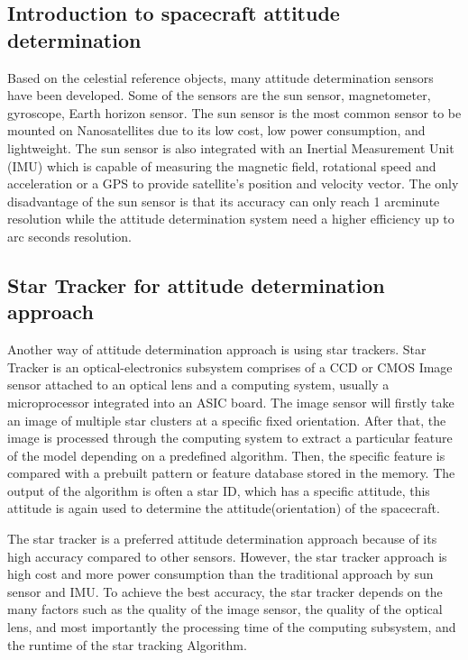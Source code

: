 \subsection{Introduction to spacecraft attitude determination}

Based on the celestial reference objects, many attitude determination sensors have been developed. Some of the sensors are the sun sensor, magnetometer, gyroscope, Earth horizon sensor\cite{MDP}. The sun sensor is the most common sensor to be mounted on Nanosatellites due to its low cost, low power consumption, and lightweight. The sun sensor is also integrated with an Inertial Measurement Unit (IMU) which is capable of measuring the magnetic field, rotational speed and acceleration or a GPS to provide satellite’s position and velocity vector. The only disadvantage of the sun sensor is that its accuracy can only reach 1 arcminute resolution while the attitude determination system need a higher efficiency up to arc seconds resolution\cite{edselc.2-52.0-001938469619810101}.

\subsection{Star Tracker for attitude determination approach}

Another way of attitude determination approach is using star trackers. Star Tracker is an optical-electronics subsystem comprises of a CCD or CMOS Image sensor attached to an optical lens and a computing system, usually a microprocessor integrated into an ASIC board. The image sensor will firstly take an image of multiple star clusters at a specific fixed orientation. After that, the image is processed through the computing system to extract a particular feature of the model depending on a predefined algorithm. Then, the specific feature is compared with a prebuilt pattern or feature database stored in the memory. The output of the algorithm is often a star ID, which has a specific attitude, this attitude is again used to determine the attitude(orientation) of the spacecraft. \\


\noindent The star tracker is a preferred attitude determination approach because of its high accuracy compared to other sensors\cite{ntu.19915319780101}. However, the star tracker approach is high cost and more power consumption than the traditional approach by sun sensor and IMU. To achieve the best accuracy, the star tracker depends on the many factors such as the quality of the image sensor, the quality of the optical lens, and most importantly the processing time of the computing subsystem, and the runtime of the star tracking Algorithm. \\

